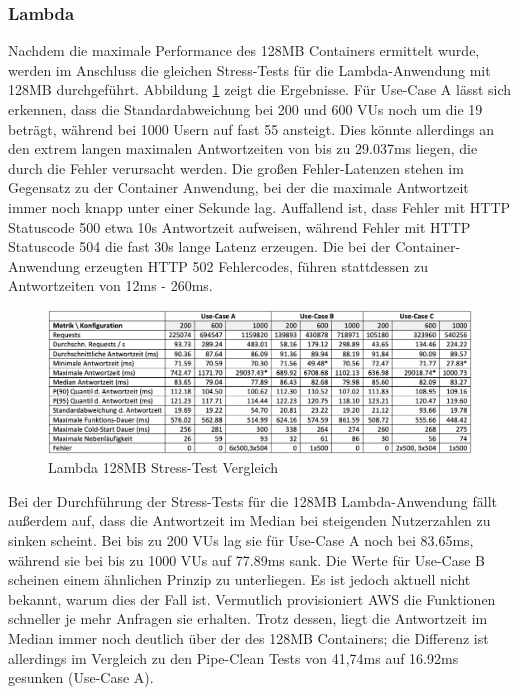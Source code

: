 \subsubsection{Lambda}
Nachdem die maximale Performance des 128MB Containers ermittelt wurde, werden im Anschluss die gleichen Stress-Tests für die Lambda-Anwendung mit 128MB durchgeführt. Abbildung \ref{fig:lambda128-stress-comparison} zeigt die Ergebnisse. Für Use-Case A lässt sich erkennen, dass die Standardabweichung bei 200 und 600 VUs noch um die 19 beträgt, während bei 1000 Usern auf fast 55 ansteigt. Dies könnte allerdings an den extrem langen maximalen Antwortzeiten von bis zu 29.037ms liegen, die durch die Fehler verursacht werden. Die großen Fehler-Latenzen stehen im Gegensatz zu der Container Anwendung, bei der die maximale Antwortzeit immer noch knapp unter einer Sekunde lag. Auffallend ist, dass Fehler mit HTTP Statuscode 500 etwa 10s Antwortzeit aufweisen, während Fehler mit HTTP Statuscode 504 die fast 30s lange Latenz erzeugen. Die bei der Container-Anwendung erzeugten HTTP 502 Fehlercodes, führen stattdessen zu  Antwortzeiten von 12ms - 260ms. 

\begin{figure}[H]
    \includegraphics[width=\textwidth]{img/lambda128-stress-comparison.png}
    \caption[Lambda 128MB Stress-Test Vergleich]{Lambda 128MB Stress-Test Vergleich}
    \label{fig:lambda128-stress-comparison}
\end{figure}

Bei der Durchführung der Stress-Tests für die 128MB Lambda-Anwendung fällt außerdem auf, dass die Antwortzeit im Median bei steigenden Nutzerzahlen zu sinken scheint. Bei bis zu 200 VUs lag sie für Use-Case A noch bei 83.65ms, während sie bei bis zu 1000 VUs auf 77.89ms sank. Die Werte für Use-Case B scheinen einem ähnlichen Prinzip zu unterliegen. Es ist jedoch aktuell nicht bekannt, warum dies der Fall ist. Vermutlich provisioniert AWS die Funktionen schneller je mehr Anfragen sie erhalten. Trotz dessen, liegt die Antwortzeit im Median immer noch deutlich über der des 128MB Containers; die Differenz ist allerdings im Vergleich zu den Pipe-Clean Tests von 41,74ms auf 16.92ms gesunken (Use-Case A).

